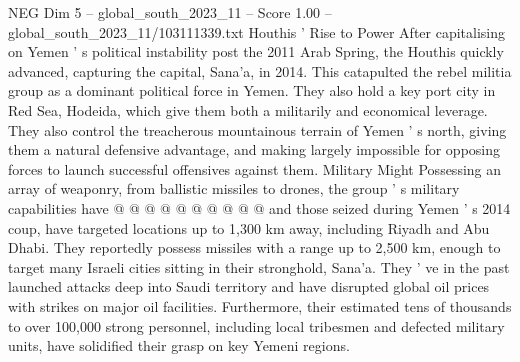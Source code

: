 \begin{textsample}{NEG Dim 5 – global\_south\_2023\_11 – Score 1.00 – global\_south\_2023\_11/103111339.txt}
Houthis ' Rise to Power After capitalising on Yemen ' s political instability post the 2011 Arab Spring, the Houthis quickly advanced, capturing the capital, Sana'a, in 2014.
This catapulted the rebel militia group as a dominant political force in Yemen.
They also hold a key port city in Red Sea, Hodeida, which give them both a militarily and economical leverage.
They also control the treacherous mountainous terrain of Yemen ' s north, giving them a natural defensive advantage, and making largely impossible for opposing forces to launch successful offensives against them.
Military Might Possessing an array of weaponry, from ballistic missiles to drones, the group ' s military capabilities have @ @ @ @ @ @ @ @ @ @ and those seized during Yemen ' s 2014 coup, have targeted locations up to 1,300 km away, including Riyadh and Abu Dhabi.
They reportedly possess missiles with a range up to 2,500 km, enough to target many Israeli cities sitting in their stronghold, Sana'a.
They ' ve in the past launched attacks deep into Saudi territory and have disrupted global oil prices with strikes on major oil facilities.
Furthermore, their estimated tens of thousands to over 100,000 strong personnel, including local tribesmen and defected military units, have solidified their grasp on key Yemeni regions.

\end{textsample}
